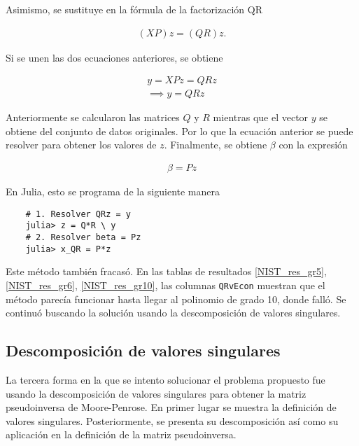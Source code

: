 \noindent Asimismo, se sustituye en la fórmula de la factorización QR

\begin{equation*}
    \begin{aligned}
    (XP) z = (QR) z . 
    \end{aligned}
\end{equation*}

\noindent Si se unen las dos ecuaciones anteriores, se obtiene 

\begin{equation*}
    \begin{aligned}
    y = XP z = QR z \\
    \implies y = QRz
    \end{aligned}
\end{equation*}

\noindent Anteriormente se calcularon las matrices $Q$ y $R$ mientras que el vector $y$ se obtiene del conjunto de datos originales. Por lo que la ecuación anterior se puede resolver para obtener los valores de $z$. Finalmente, se obtiene $\beta$ con la expresión 

\begin{equation*}
    \begin{aligned}
    \beta = Pz
    \end{aligned}
\end{equation*}

En Julia, esto se programa de la siguiente manera
\begin{verbatim}
    # 1. Resolver QRz = y
    julia> z = Q*R \ y
    # 2. Resolver beta = Pz
    julia> x_QR = P*z
\end{verbatim}


Este método también fracasó. En las tablas de resultados \ref{NIST_res_gr5}, \ref{NIST_res_gr6}, \ref{NIST_res_gr10}, las columnas \texttt{QRvEcon} muestran que el método parecía funcionar hasta llegar al polinomio de grado 10, donde falló. Se continuó buscando la solución usando la descomposición de valores singulares.

\subsection{Descomposición de valores singulares}

La tercera forma en la que se intento solucionar el problema propuesto fue usando la descomposición de valores singulares para obtener la matriz pseudoinversa de Moore-Penrose. En primer lugar se muestra la definición de valores singulares. Posteriormente, se presenta su descomposición así como su aplicación en la definición de la matriz pseudoinversa. 

